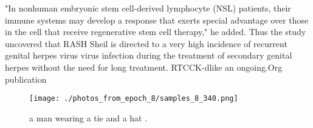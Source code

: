 \documentclass{article}%
\begin{document}
"In nonhuman embryonic stem cell{-}derived lymphocyte (NSL) patients, their immune systems may develop a response that exerts special advantage over those in the cell that receive regenerative stem cell therapy," he added.\newline%
Thus the study uncovered that RASH Sheil is directed to a very high incidence of recurrent genital herpes virus virus infection during the treatment of secondary genital herpes without the need for long treatment.\newline%
RTCCK{-}dlike an ongoing.Org publication\newline%

%


\begin{figure}[h!]%
\centering%
\texttt{[image: ./photos\_from\_epoch\_8/samples\_8\_340.png]}%
\caption{a man wearing a tie and a hat .}%
\end{figure}

%
\end{document}

